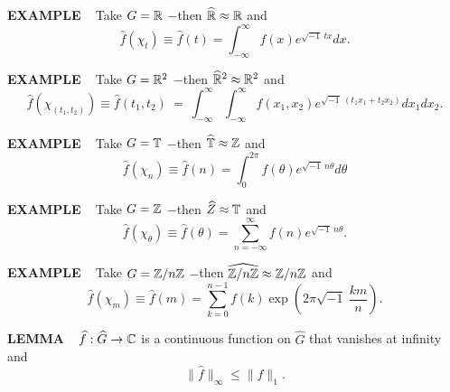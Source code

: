\vspace{0.1cm}

\begin{x}{\small\bf EXAMPLE} \ %
Take $G = \mathbb{R}$ $-$then $\widehat{\mathbb{R}} \approx \mathbb{R}$ and
\[
\widehat{f}(\chi_t) \equiv \widehat{f}(t) = \int_{-\infty}^\infty  f(x) e ^{\sqrt{-1}\  tx} dx.
\]
\end{x}

\vspace{0.1cm}

\begin{x}{\small\bf EXAMPLE} \ %
Take $G = \mathbb{R}^2$ $-$then $\widehat{\mathbb{R}}^2 \approx \mathbb{R}^2$ and
\[
\widehat{f}(\chi_{(t_1,t_2)}) \equiv \widehat{f}(t_1 , t_2) \ 
= \ \int_{-\infty}^\infty  \int_{-\infty}^\infty  f(x_1, x_2) e ^{\sqrt{-1} \ (t_1 x_1 + t_2 x_2)} dx_1 dx_2.
\]
\end{x}

\vspace{0.1cm}

\begin{x}{\small\bf EXAMPLE} \ %
Take $G = \mathbb{T}$ $-$then $\widehat{\mathbb{T}} \approx \mathbb{Z}$ and
\[
\widehat{f}(\chi_n) \equiv \widehat{f}(n) 
=  \int_{0}^{2\pi}  f(\theta) e^{\sqrt{-1} \ n \theta} d\theta
\]
\end{x}

\vspace{0.1cm}

\begin{x}{\small\bf EXAMPLE} \ %
Take $G = \mathbb{Z}$ $-$then $\widehat{Z} \approx \mathbb{T}$ and
\[
\widehat{f}(\chi_\theta) \equiv \widehat{f}(\theta) =  \sum_{n = -\infty}^\infty f(n) e^{\sqrt{-1} \ n \theta}.
\]
\end{x}

\vspace{0.1cm}

\begin{x}{\small\bf EXAMPLE} \ %
Take $G = \mathbb{Z}/n\mathbb{Z}$ $-$then $\widehat{\mathbb{Z}/n\mathbb{Z}} \approx \mathbb{Z}/n\mathbb{Z}$ and
\[
\widehat{f}(\chi_m) \equiv \widehat{f}(m) =  \sum_{k = 0}^{n - 1}f(k) \exp(2 \pi \sqrt{-1} \ \frac{km}{n}). 
\]
\end{x}

\vspace{0.1cm}

\begin{x}{\small\bf LEMMA} \ %
$\widehat{f} : \widehat{G} \rightarrow \mathbb{C}$ is a continuous function on $\widehat{G}$ that vanishes at infinity and
\[
\| \widehat{f} \|_\infty \le \| f  \|_1.
\]
\end{x}

